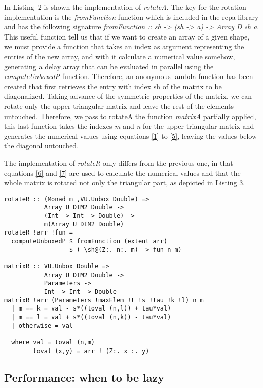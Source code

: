 \documentclass{tmr}
\begin{document}
In Listing~2 is shown the implementation of \textit{rotateA}. The key for the rotation
implementation is the \textit{fromFunction} function which is included in the 
repa library and has the following signature 
\textit{fromFunction :: sh -> (sh -> a) -> Array D sh a}.
This useful function tell us that if we want to create an array of a given shape,
we must provide a function that takes an index as argument representing the entries of
the new array, and with it calculate a numerical value somehow,
generating a delay array that can be evaluated in parallel using the \textit{computeUnboxedP} function.
Therefore, an anonymous lambda function has been created that first retrieves the entry with index sh 
of the matrix to be diagonalized. Taking advance of the symmetric properties of the matrix, we can 
rotate only the upper triangular matrix and leave the rest of the elements untouched. Therefore, we pass
to rotateA the function \textit{matrixA} partially applied, this last function takes the indexes \textit{m}
and \textit{n} for the upper triangular matrix and generates the numerical values using equations 
\eqref{1} to \eqref{5}, leaving the values below the diagonal untouched.

The implementation of \textit{rotateR} only differs from the previous one, in that
equations \eqref{6} and \eqref{7} are used to calculate the numerical values and
that the whole matrix is rotated not only the triangular part, as depicted in Listing 3.

\begin{lstlisting}[float,captionpos=b,belowcaptionskip=4pt, caption= rotateR function]
rotateR :: (Monad m ,VU.Unbox Double) =>
           Array U DIM2 Double ->
           (Int -> Int -> Double) ->
           m(Array U DIM2 Double)
rotateR !arr !fun =
  computeUnboxedP $ fromFunction (extent arr)
                  $ ( \sh@(Z:. n:. m) -> fun n m)
        
matrixR :: VU.Unbox Double =>
           Array U DIM2 Double ->
           Parameters ->
           Int -> Int -> Double
matrixR !arr (Parameters !maxElem !t !s !tau !k !l) n m
  | m == k = val - s*((toval (n,l)) + tau*val)
  | m == l = val + s*((toval (n,k)) - tau*val)
  | otherwise = val

  where val = toval (n,m)
        toval (x,y) = arr ! (Z:. x :. y)
\end{lstlisting}

\subsection{Performance: when to be lazy}
\end{document}
